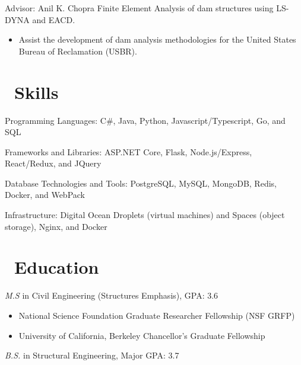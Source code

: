 \documentclass{resume}
\begin{document}
 {Advisor: Anil K. Chopra}
Finite Element Analysis of dam structures using LS-DYNA and EACD.
\begin{itemize}
  \item Assist the development of dam analysis methodologies for the United States Bureau of
          Reclamation (USBR).
\end{itemize}


\section{\faCogs\ Skills}

  Programming Languages: C\#, Java, Python, Javascript/Typescript, Go, and SQL

  Frameworks and Libraries: ASP.NET Core, Flask, Node.js/Express, React/Redux, and JQuery
 
  Database Technologies and Tools: PostgreSQL, MySQL, MongoDB, Redis, Docker, and WebPack
 
  Infrastructure: Digital Ocean Droplets (virtual machines) and Spaces (object storage), Nginx, and Docker


\section{\faGraduationCap\ Education}
\textit{M.S } in Civil Engineering (Structures Emphasis), GPA: 3.6
\begin{itemize}
 \item National Science Foundation Graduate Researcher Fellowship (NSF GRFP)
 \item University of California, Berkeley Chancellor's Graduate Fellowship
\end{itemize}

\textit{B.S.} in Structural Engineering, Major GPA: 3.7

%
%
\end{document}
